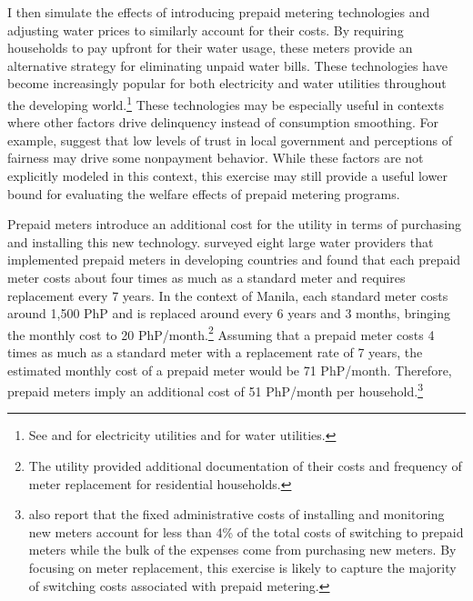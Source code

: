 \documentclass[12pt]{article}
\begin{document}
I then simulate the effects of introducing prepaid metering technologies and adjusting water prices to similarly account for their costs.  By requiring households to pay upfront for their water usage, these meters provide an alternative strategy for eliminating unpaid water bills.  These technologies have become increasingly popular for both electricity and water utilities throughout the developing world.\footnote{See \cite{jack2016charging} and \cite{northeast2014} for electricity utilities and \cite{heymans2014limits} for water utilities.}  These technologies may be especially useful in contexts where other factors drive delinquency instead of consumption smoothing.   For example, \cite{szabo2015reducing} suggest that low levels of trust in local government and perceptions of fairness may drive some nonpayment behavior.  While these factors are not explicitly modeled in this context, this exercise may still provide a useful lower bound for evaluating the welfare effects of prepaid metering programs.


Prepaid meters introduce an additional cost for the utility in terms of purchasing and installing this new technology.  \cite{heymans2014limits} surveyed eight large water providers that implemented prepaid meters in developing countries and found that each prepaid meter costs about four times as much as a standard meter and requires replacement every 7 years.  In the context of Manila, each standard meter costs around 1,500 PhP and is replaced around every 6 years and 3 months, bringing the monthly cost to 20 PhP/month.\footnote{The utility provided additional documentation of their costs and frequency of meter replacement for residential households.}  Assuming that a prepaid meter costs 4 times as much as a standard meter with a replacement rate of 7 years, the estimated monthly cost of a prepaid meter would be 71 PhP/month.  Therefore, prepaid meters imply an additional cost of 51 PhP/month per household.\footnote{\cite{heymans2014limits} also report that the fixed administrative costs of installing and monitoring new meters account for less than 4\% of the total costs of switching to prepaid meters while the bulk of the expenses come from purchasing new meters.  By focusing on meter replacement, this exercise is likely to capture the majority of switching costs associated with prepaid metering.}  
\end{document}
